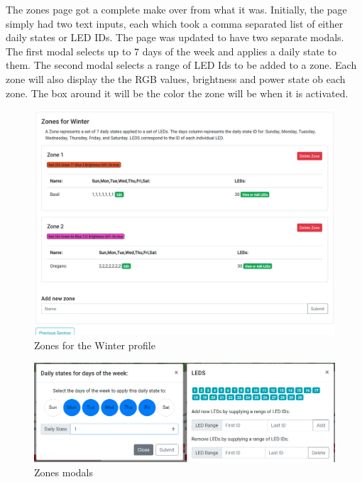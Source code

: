 \documentclass[onecolumn, draftclsnofoot,10pt, compsoc]{IEEEtran}
\begin{document}
		\noindent The zones page got a complete make over from what it was.
		Initially, the page simply had two text inputs, each which took a comma separated list of either daily states or LED IDs.
		The page was updated to have two separate modals. The first modal selects up to 7 days of the week and applies a daily state to them.
		The second modal selects a range of LED Ids to be added to a zone. Each zone will also display the the RGB values, brightness and power state ob each zone. The box around it will be the color the zone will be when it is activated.

		\begin{center}
			\begin{figure}[H]
				\includegraphics[width=\linewidth]{site/zones_winter.png}
				\caption{Zones for the Winter profile}
				\label{fig:siteZonesWinter}
			\end{figure}
		\end{center}
		\begin{center}
			\begin{figure}[H]
				\includegraphics[width=\linewidth]{site/modals.png}
				\caption{Zones modals}
				\label{fig:siteZonesWinterModals}
			\end{figure}
		\end{center}
\end{document}
